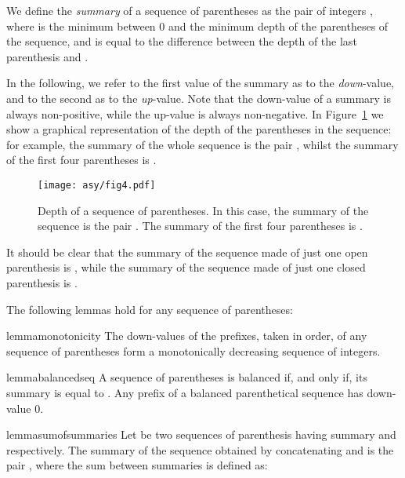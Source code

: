 \documentclass[a4paper,USenglish]{lipics}
\begin{document}
		\begin{definition}
		We define the \emph{summary} of a sequence of parentheses as the pair of integers , where  is the minimum between 0 and the minimum depth of the parentheses of the sequence, and  is equal to the difference between the depth of the last parenthesis and .
		\end{definition}
In the following, we  refer to the first value of the summary as to the \emph{down}-value, and to the second as to the \emph{up}-value. Note that the down-value of a summary is always non-positive, while the up-value is always non-negative. In Figure~\ref{fig:basic summary} we show a graphical representation of the depth of the parentheses in the sequence: for example, the summary of the whole sequence is the pair , whilst the summary of the first four parentheses is .
		\begin{figure}[t]\centering 
			\texttt{[image: asy/fig4.pdf]}\\
			\caption{Depth of a sequence of parentheses. In this case, the summary of the sequence is the pair . The summary of the first four parentheses is .\label{fig:basic summary}}


		\end{figure}
		It should be clear that the summary of the sequence made of just one open parenthesis is , while the summary of the sequence made of just one closed parenthesis is .
		
		The following lemmas hold for any sequence of parentheses:


\begin{restatable}{lemma}{monotonicity}
\label{lem:monotonicity}
	The down-values of the prefixes, taken in order, of any sequence of parentheses form a monotonically decreasing sequence of integers.
\end{restatable}
		
\begin{restatable}{lemma}{balancedseq}
			\label{lem:balancedseq}
			A sequence of parentheses is balanced if, and only if, its summary is equal to . Any prefix of a balanced parenthetical sequence has down-value 0.
\end{restatable}

\begin{restatable}{lemma}{sumofsummaries}
\label{lem:sumofsummaries}
			Let  be two sequences of parenthesis having summary  and  respectively. The summary of the sequence  obtained by concatenating  and  is the pair , where the sum between summaries is defined as:
			
\end{restatable}
\end{document}
